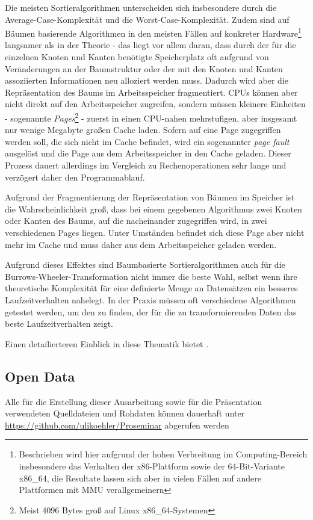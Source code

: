 \documentclass[ngerman,pdftex,paper=A4,DIV=calc,titlepage,12pt]{scrartcl}
\newtheorem[L]{boxedDefinition}{Definition}
\begin{document}
Die meisten Sortieralgorithmen unterscheiden sich insbesondere durch die Average-Case-Komplexität und die Worst-Case-Komplexität. Zudem sind auf Bäumen basierende Algorithmen in den meisten Fällen auf konkreter Hardware\footnote{Beschrieben wird hier aufgrund der hohen Verbreitung im Computing-Bereich insbesondere das Verhalten der x86-Plattform sowie der 64-Bit-Variante x86\_64, die Resultate lassen sich aber in vielen Fällen auf andere Plattformen mit MMU\footnotemark{} verallgemeinern} langsamer als in der Theorie - das liegt vor allem daran, dass durch der für die einzelnen Knoten und Kanten benötigte Speicherplatz oft aufgrund von Veränderungen an der Baumstruktur oder der mit den Knoten und Kanten assoziierten Informationen neu alloziert werden muss. Dadurch wird aber die Repräsentation des Baums im Arbeitsspeicher fragmentiert. CPUs können aber nicht direkt auf den Arbeitsspeicher zugreifen, sondern müssen kleinere Einheiten - sogenannte \textit{Pages}\footnote{Meist 4096 Bytes groß auf Linux x86\_64-Systemen} - zuerst in einen CPU-nahen mehrstufigen, aber insgesamt nur wenige Megabyte großen Cache laden. Sofern auf eine Page zugegriffen werden soll, die sich nicht im Cache befindet, wird ein sogenannter \textit{page fault} ausgelöst und die Page aus dem Arbeitsspeicher in den Cache geladen. Dieser Prozess dauert allerdings im Vergleich zu Rechenoperationen sehr lange und verzögert daher den Programmablauf.

Aufgrund der Fragmentierung der Repräsentation von Bäumen im Speicher ist die Wahrscheinlichkeit groß, dass bei einem gegebenen Algorithmus zwei Knoten oder Kanten des Baums, auf die nacheinander zugegriffen wird, in zwei verschiedenen Pages liegen. Unter Umständen befindet sich diese Page aber nicht mehr im Cache und muss daher aus dem Arbeitsspeicher geladen werden. 

Aufgrund dieses Effektes sind Baumbasierte Sortieralgorithmen auch für die Burrows-Wheeler-Transformation nicht immer die beste Wahl, selbst wenn ihre theoretische Komplexität für eine definierte Menge an Datensätzen ein besseres Laufzeitverhalten nahelegt. In der Praxis müssen oft verschiedene Algorithmen getestet werden, um den zu finden, der für die zu transformierenden Daten das beste Laufzeitverhalten zeigt.

Einen detailierteren Einblick in diese Thematik bietet \cite{Drepper2007}.

\renewcommand\refname{Literatur- und Quellenverzeichnis}


\subsection*{Open Data}\label{opendata}
Alle für die Erstellung dieser Ausarbeitung sowie für die Präsentation verwendeten Quelldateien und Rohdaten können dauerhaft unter \url{https://github.com/ulikoehler/Proseminar} abgerufen werden
\end{document}
